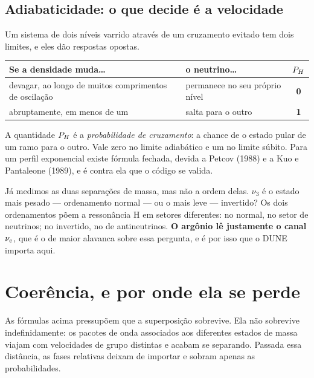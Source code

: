\subsection{Adiabaticidade: o que decide é a velocidade}

Um sistema de dois níveis varrido através de um cruzamento evitado tem dois
limites, e eles dão respostas opostas.

\begin{center}
\begin{tabular}{@{}>{\sffamily\small}p{5.2cm} >{\sffamily\small}p{4.8cm} >{\sffamily\bfseries}c@{}}
\toprule
\sffamily\bfseries\small Se a densidade muda\dots & \sffamily\bfseries\small o neutrino\dots
  & \sffamily\bfseries\small $P_H$ \\
\midrule
devagar, ao longo de muitos comprimentos de oscilação
  & permanece no seu próprio nível & 0 \\
abruptamente, em menos de um
  & salta para o outro & 1 \\
\bottomrule
\end{tabular}
\end{center}

A quantidade $P_H$ é a \emph{probabilidade de cruzamento}: a chance de o estado
pular de um ramo para o outro. Vale zero no limite adiabático e um no limite
súbito. Para um perfil exponencial existe fórmula fechada, devida a Petcov
(1988) e a Kuo e Pantaleone (1989), e é contra ela que o código se valida.

\begin{alerta}
Já medimos as duas separações de massa, mas não a ordem delas. $\nu_3$ é o
estado mais pesado --- ordenamento normal --- ou o mais leve --- invertido? Os
dois ordenamentos põem a ressonância H em setores diferentes: no normal, no
setor de neutrinos; no invertido, no de antineutrinos. \textbf{O argônio lê
justamente o canal $\nu_e$}, que é o de maior alavanca sobre essa pergunta, e é
por isso que o DUNE importa aqui.
\end{alerta}

\section{Coerência, e por onde ela se perde}

As fórmulas acima pressupõem que a superposição sobrevive. Ela não sobrevive
indefinidamente: os pacotes de onda associados aos diferentes estados de massa
viajam com velocidades de grupo distintas e acabam se separando. Passada essa
distância, as fases relativas deixam de importar e sobram apenas as
probabilidades.

